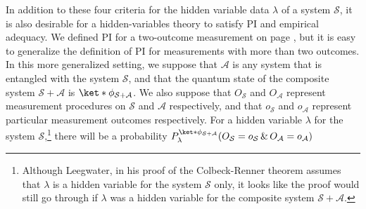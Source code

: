 \documentclass[12pt]{report}
\providecommand{\DIFaddbegin}{} %
\providecommand{\DIFaddend}{} %
\providecommand{\DIFdelbegin}{} %
\providecommand{\DIFdelend}{} %
\begin{document}
In addition to these four criteria for the hidden variable data $\lambda$ of a system $\mathcal{S}$, it is also desirable for a hidden-variables theory to satisfy PI and empirical adequacy. We defined PI for a two-outcome measurement on page \pageref{PIdef}, but it is easy to generalize the definition of PI for measurements with more than two outcomes. In this more generalized setting, we suppose that $\mathcal{A}$ is any system that is entangled with the system $\mathcal{S}$, and that the quantum state of the composite system $\mathcal{S}+\mathcal{A}$  is $\ket*{\phi}_{\mathcal{S}+\mathcal{A}}$. We also suppose that $O_{\mathcal{S}}$ and $O_{\mathcal{A}}$  %
\DIFdelbegin %
\DIFdelend \DIFaddbegin {}\DIFaddend %
 represent measurement procedures on $\mathcal{S}$ and $\mathcal{A}$ respectively, and that $o_{\mathcal{S}}$ and $o_{\mathcal{A}}$  %
 represent particular measurement outcomes respectively. For a hidden variable $\lambda$ for the system $\mathcal{S}$,\footnote{Although Leegwater, in his proof of the Colbeck-Renner theorem assumes that $\lambda$ is a hidden variable for the system $\mathcal{S}$ only, it looks like the proof would still go through if $\lambda$ was a hidden variable for the composite system $\mathcal{S}+\mathcal{A}$.} there will be a probability $P_\lambda^{\ket*{\phi}_{\mathcal{S}+\mathcal{A}}}(O_\mathcal{S}=o_\mathcal{S}\, \& \, O_\mathcal{A}=o_\mathcal{A})$ %
 \DIFdelbegin %
\DIFdelend \DIFaddbegin {}\DIFaddend %
\end{document}
